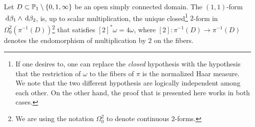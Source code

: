 \documentclass[a4paper,12pt]{article}
\theoremstyle{remark}
\begin{document}
\begin{proposition}\label{Prop:uniqueform}
	Let $D \subset \P_1\setminus \{0,1,\infty\}$ be an open simply connected domain. The $(1,1)$-form $\de \beta_1 \wedge \de \beta_2$, is, up to scalar multiplication, the unique closed\footnote{If one desires to, one can replace the \textit{closed} hypothesis with the hypothesis that the restriction of $\omega$ to the fibers of $\pi$ is the normalized Haar measure. We note that the two different hypothesis are logically independent among each other. On the other hand, the proof that is presented here works in both cases.} $2$-form in $\Omega_0^2(\pi^{-1}(D))$\footnote{We are using the notation $\Omega_0^2$ to denote continuous $2$-forms. } that satisfies $[2]^*\omega=4\omega$, where  $[2]:\pi^{-1}(D) \rightarrow \pi^{-1}(D)$ denotes the endomorphism of multiplication by $2$ on the fibers.
\end{proposition}
\end{document}
